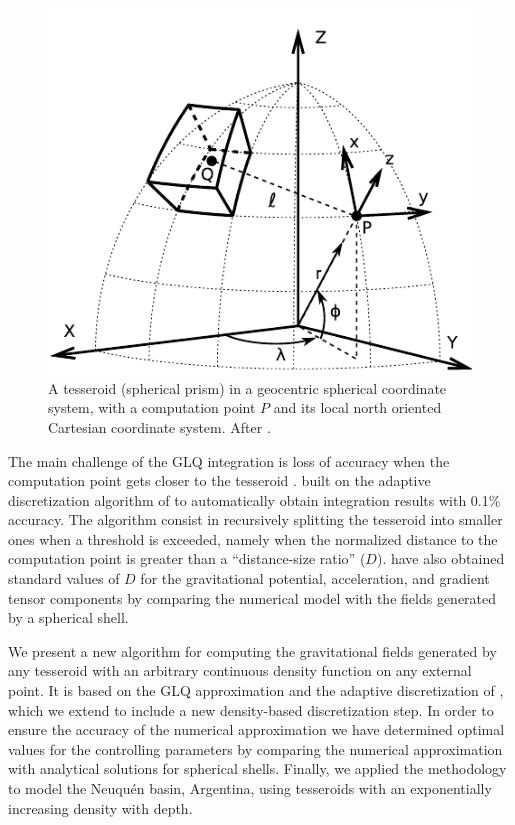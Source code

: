\documentclass[extra]{gji}
\begin{document}
\begin{figure}
\centering
\includegraphics[width=0.9\linewidth]{figures/tesseroid-uieda.pdf}
\caption{
    A tesseroid (spherical prism) in a geocentric spherical coordinate system, with a
    computation point $P$ and its local north oriented Cartesian coordinate system.
    After \citet{Uieda2015}.
}
\label{fig:tesseroid}
\end{figure}

The main challenge of the GLQ integration is loss of accuracy when the computation point
gets closer to the tesseroid \citep{Ku1977}.
\citet{Uieda2016} built on the adaptive discretization algorithm of \citet{Li2011}
to automatically obtain integration results with 0.1\% accuracy.
The algorithm consist in recursively splitting the tesseroid into smaller ones when a
threshold is exceeded,
namely when the normalized distance to the computation point is greater than a
``distance-size ratio'' ($D$).
\citet{Uieda2016} have also obtained standard values of $D$
for the gravitational potential, acceleration, and gradient tensor components
by comparing the numerical model with the fields generated by a spherical shell.

We present a new algorithm for computing the gravitational fields generated by any
tesseroid with an arbitrary continuous density function on any external point.
It is based on the GLQ approximation and the adaptive discretization of
\citet{Uieda2016}, which we extend to include a new density-based discretization step.
In order to ensure the accuracy of the numerical approximation we have
determined optimal values for the controlling parameters by
comparing the numerical approximation with analytical solutions for
spherical shells.
Finally, we applied the methodology to model the Neuqu\'en basin, Argentina, using
tesseroids with an exponentially increasing density with depth.
\end{document}
